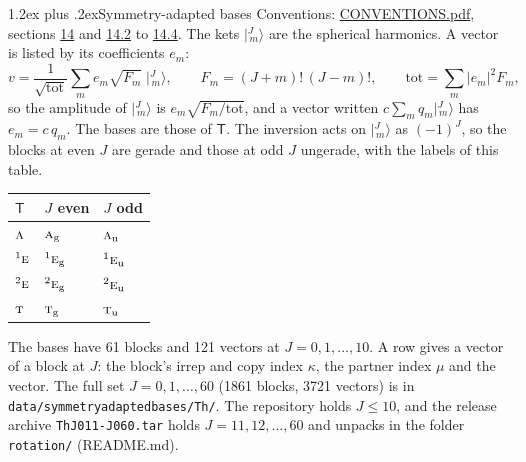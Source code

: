 \documentclass[10pt,a4paper]{article}
\makeatletter
\renewcommand\section{\@startsection{section}{1}{\z@}{-3ex plus -1ex minus -.2ex}%
  {1.2ex plus .2ex}{\normalfont\large\sffamily\bfseries\color{parttitle}}}
\numberwithin{equation}{section}
\newcommand{\grp}[1]{\mathsf{#1}}
\newcommand{\irr}[1]{\text{\normalfont\scshape #1}}
\newcommand{\conjpair}[1]{{}^{#1}}
\newcommand{\ptag}[1]{\mathrm{#1}}
\newcommand{\mult}{\kappa}
\newcommand{\intx}{\mu}
\newcommand{\jm}[2]{\bigl\lvert{}^{#1}_{\,#2}\bigr\rangle}
\makeatother
\begin{document}
\section{Symmetry-adapted bases}\label{s:bases}
Conventions: \href{../../CONVENTIONS.pdf}{CONVENTIONS.pdf}, sections \href{../../CONVENTIONS.pdf\#conv.14}{14} and \href{../../CONVENTIONS.pdf\#conv.14.2}{14.2} to \href{../../CONVENTIONS.pdf\#conv.14.4}{14.4}.
\leavevmode\label{n:index.m}\label{n:vector.ket}The kets $\jm{J}{m}$ are the spherical harmonics. \label{n:index.ketcoefficient}\label{n:vector.basis.symmetry}\label{n:index.ketweight}\label{n:index.total}A vector is listed by its coefficients $e_m$:
\begin{equation}\label{e:ket}v = \frac{1}{\sqrt{\mathrm{tot}}}\sum_m e_m\sqrt{F_m}\;\jm{J}{m},\qquad F_m = (J+m)!\,(J-m)!,\qquad \mathrm{tot} = \sum_m |e_m|^2F_m,\end{equation}
\leavevmode\label{n:index.factor.c}\label{n:index.multiplicity.copies}so the amplitude of $\jm{J}{m}$ is $e_m\sqrt{F_m/\mathrm{tot}}$, and a vector written $c\sum_m q_m\jm{J}{m}$ has $e_m = c\,q_m$.
The bases are those of \href{T.pdf}{$\grp{T}$}. The inversion acts on $\jm{J}{m}$ as $(-1)^J$, so the blocks at even $J$ are gerade and those at odd $J$ ungerade, with the labels of this table.
\begin{center}\begin{tabular}{@{}lll@{}}\toprule
\href{T.pdf}{$\grp{T}$} & $J$ even & $J$ odd\\\midrule
$\irr{a}$ & $\irr{a}_{\ptag{g}}$ & $\irr{a}_{\ptag{u}}$\\
$\conjpair{1}\irr{e}$ & $\conjpair{1}\irr{e}_{\ptag{g}}$ & $\conjpair{1}\irr{e}_{\ptag{u}}$\\
$\conjpair{2}\irr{e}$ & $\conjpair{2}\irr{e}_{\ptag{g}}$ & $\conjpair{2}\irr{e}_{\ptag{u}}$\\
$\irr{t}$ & $\irr{t}_{\ptag{g}}$ & $\irr{t}_{\ptag{u}}$\\
\bottomrule\end{tabular}\end{center}
The bases have 61 blocks and 121 vectors at $J = 0, 1, \dots, 10$. \label{n:head.vector}A row gives a vector of a block at $J$: the block's irrep and copy index $\mult$, the partner index $\intx$ and the vector. The full set $J = 0, 1, \dots, 60$ (1861 blocks, 3721 vectors) is in \texttt{data/symmetryadaptedbases/Th/}. The repository holds $J \le 10$, and the release archive \texttt{ThJ011-J060.tar} holds $J = 11, 12, \dots, 60$ and unpacks in the folder \texttt{rotation/} (README.md).
\end{document}
